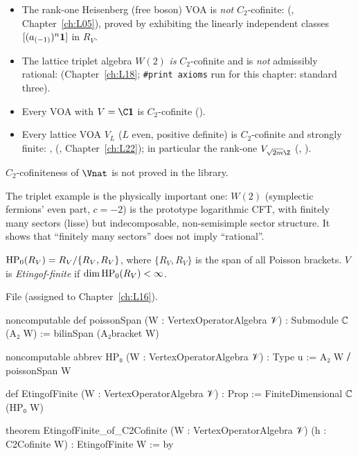 \begin{example}\label{l12:ex:c2}
\begin{itemize}
\item The rank-one Heisenberg (free boson) VOA is \emph{not} $C_2$-cofinite: 
  (, Chapter~\ref{ch:L05}), proved by exhibiting the
  linearly independent classes $[(a_{(-1)})^n\mathbf{1}]$ in $R_V$.
\item The lattice triplet algebra $W(2)$ \emph{is} $C_2$-cofinite and is \emph{not} admissibly rational:
  \allowbreak{}\allowbreak{}\allowbreak{}\allowbreak{}\allowbreak{}\allowbreak{}\allowbreak{}\allowbreak{}
  (Chapter~\ref{ch:L18}; \texttt{\#print axioms} run for this chapter: standard three).
\item Every VOA with $V = \C\ltwelvevac$ is $C_2$-cofinite ().
\item Every lattice VOA $V_L$ ($L$ even, positive definite) is $C_2$-cofinite and strongly finite:
  , 
  (, Chapter~\ref{ch:L22}); in
  particular the rank-one $V_{\sqrt{2m}\Z}$ (, ).
\end{itemize}
$C_2$-cofiniteness of $\Vnat$ is not proved in the library.
\end{example}

\begin{physics}
The triplet example is the physically important one: $W(2)$ (symplectic fermions' even part, $c=-2$) is the
prototype logarithmic CFT, with finitely many sectors (lisse) but indecomposable, non-semisimple sector
structure. It shows that ``finitely many sectors'' does not imply ``rational''.
\end{physics}

\begin{definition}\label{l12:def:etingof}
$\mathrm{HP}_0(R_V) = R_V/\{R_V,R_V\}$, where $\{R_V,R_V\}$ is the span of all Poisson brackets. $V$ is
\emph{Etingof-finite} if $\dim\mathrm{HP}_0(R_V)<\infty$.
\end{definition}
\noindent File  (assigned to Chapter~\ref{ch:L16}).
\begin{leancode}
noncomputable def poissonSpan (W : VertexOperatorAlgebra 𝒱) : Submodule ℂ (A₂ W) :=
  bilinSpan (A₂bracket W)

noncomputable abbrev HP₀ (W : VertexOperatorAlgebra 𝒱) : Type u := A₂ W ⧸ poissonSpan W

def EtingofFinite (W : VertexOperatorAlgebra 𝒱) : Prop := FiniteDimensional ℂ (HP₀ W)

theorem EtingofFinite_of_C2Cofinite (W : VertexOperatorAlgebra 𝒱) (h : C2Cofinite W) :
    EtingofFinite W := by
\end{leancode}

